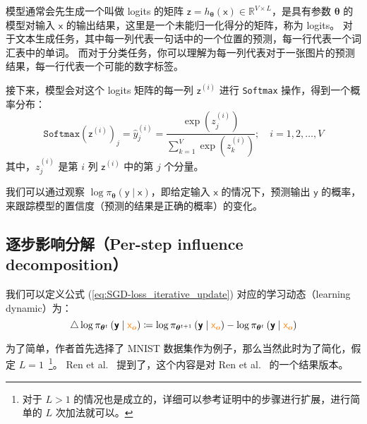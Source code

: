 \documentclass[citestyle=gb7714-2015, bibstyle=gb7714-2015,lang=cn,14pt,scheme=chinese]{elegantbook}
\begin{document}
模型通常会先生成一个叫做 logits 的矩阵 \(\bm{\mathsf{z}} = h_{\bm{\theta}} \left( \bm{\mathsf{x}} \right) \in \mathbb{R}^{V \times L}\)，是具有参数 \(\bm{\theta}\) 的模型对输入 \(\bm{\mathsf{x}}\) 的输出结果，这里是一个未能归一化得分的矩阵，称为 logits。
对于文本生成任务，其中每一列代表一句话中的一个位置的预测，每一行代表一个词汇表中的单词。
而对于分类任务，你可以理解为每一列代表对于一张图片的预测结果，每一行代表一个可能的数字标签。

接下来，模型会对这个 logits 矩阵的每一列 \(\bm{\mathsf{z}}^{(i)}\) 进行 \texttt{Softmax} 操作，得到一个概率分布：
\begin{equation}\label{eq:softmax}
    \mathtt{Softmax} \left( \bm{\mathsf{z}}^{(i)} \right)_{j} = \hat{y}^{(i)}_{j} = \frac{\exp \left( z^{(i)}_{j} \right)}{\sum_{k=1}^{V} \exp \left( z^{(i)}_{k} \right)}; \quad i = 1, 2, \dots, V
\end{equation}
其中，\(z^{(i)}_{j}\) 是第 \(i\) 列 \(\bm{\mathsf{z}}^{(i)}\) 中的第 \(j\) 个分量。

我们可以通过观察 \(\log \pi_{\bm{\theta}} \left( \bm{\mathsf{y}} \mid \bm{\mathsf{x}} \right)\)，即给定输入 \(\bm{\mathsf{x}}\) 的情况下，预测输出 \(\bm{\mathsf{y}}\) 的概率，来跟踪模型的置信度（预测的结果是正确的概率）的变化。

\subsection{逐步影响分解（Per-step influence decomposition）}

我们可以定义公式 (\ref{eq:SGD-loss_iterative_update}) 对应的学习动态（learning dynamic）为：
\begin{equation}\label{eq:SGD-learning_dynamic}
    \triangle \log \pi_{\bm{\theta}^{t}} \left( \bm{\mathsf{y}} \mid \textcolor{orange}{\bm{\textsf{x}_{o}}} \right) \coloneq \log \pi_{\bm{\theta}^{t+1}} \left( \bm{\mathsf{y}} \mid \textcolor{orange}{\bm{\textsf{x}_{o}}} \right) - \log \pi_{\bm{\theta}^{t}} \left( \bm{\mathsf{y}} \mid \textcolor{orange}{\bm{\textsf{x}_{o}}} \right)
\end{equation}

为了简单，作者首先选择了 MNIST 数据集作为例子，那么当然此时为了简化，假定 \(L=1\)~\footnote{对于 \(L > 1\) 的情况也是成立的，详细可以参考证明中的步骤进行扩展，进行简单的 \(L\) 次加法就可以。}。
Ren et al.~\cite{DBLP:conf/iclr/RenS25} 提到了，这个内容是对 Ren et al.~\cite{DBLP:conf/iclr/RenGS22} 的一个结果版本。

\end{document}
